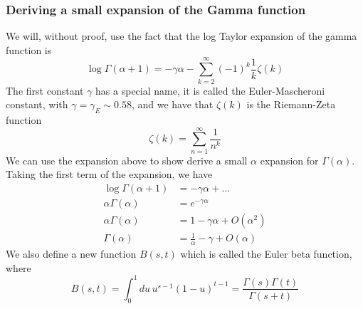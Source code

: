 \documentclass[11pt, oneside]{article}   	%
\theoremstyle{slanted}
\begin{document}
\subsubsection{Deriving a small expansion of the Gamma function}
We will, without proof, 
use the fact that the log Taylor expansion 
of the gamma function is 
\[
\log \Gamma \left( \alpha + 1  \right)  
= - \gamma \alpha  - \sum_{ k = 2  }^{ \infty  } \left( - 1  \right)  ^{ k } 
\frac{1}{k } \zeta \left( k  \right) 
\] The first constant $ \gamma $ has a special name, 
it is called the Euler-Mascheroni constant, with 
$ \gamma  = \gamma _ E  \sim 0.58 $, 
and we have that  $ \zeta \left( k  \right)  $ is the 
Riemann-Zeta function
\[
\zeta \left( k  \right)  = \sum _{ n = 1  } ^{ \infty } \frac{1}{n ^ k } 
\] We can use the expansion 
above to show derive 
a small $ \alpha  $ expansion for $ \Gamma \left(  \alpha  \right)  $. 
Taking the first term of the expansion, we 
have 
\begin{align*}
\log \Gamma \left( \alpha + 1  \right)  &=  - \gamma \alpha + \dots  \\ 
\alpha \Gamma \left( \alpha  \right)  & = e ^{ - \gamma \alpha } \\
\alpha \Gamma \left( \alpha  \right)   &= 1- \gamma \alpha + O \left( \alpha ^ 2  \right)   \\
\Gamma \left( \alpha  \right)  &=  \frac{1}{\alpha } - \gamma + 
O \left( \alpha  \right)   
\end{align*}
We also define a new function 
$ B \left( s, t  \right)  $ which is 
called the Euler beta function, where 
\[
B \left( s, t  \right)   = \int _ 0 ^ 1 
du \, u ^{ s- 1 } \left(  1 - u  \right)  ^{ t - 1 }   = 
\frac{\Gamma \left( s  \right)  \Gamma \left(  t  \right)  }{ 
\Gamma \left( s + t \right) }
\] 
\end{document}
